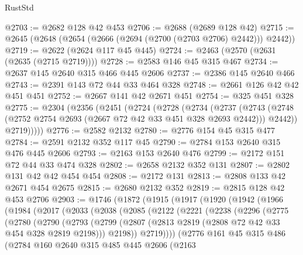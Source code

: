 \begin{lexlean}{RustStd}
\begin{coremodule}
@2703 := @2682 @128 @42 @453
@2706 := @2688 (@2689 @128 @42)
@2715 := @2645 (@2648 (@2654 (@2666 (@2694 (@2700 (@2703 @2706) @2442))) @2442))
@2719 := @2622 (@2624 @117 @45 @445)
@2724 := @2463 (@2570 (@2631 (@2635 (@2715 @2719))))
@2728 := @2583 @146 @45 @315 @467
@2734 := @2637 @145 @2640 @315 @466 @445 @2606
@2737 := @2386 @145 @2640 @466
@2743 := @2391 @143 @72 @44 @33 @464 @328
@2748 := @2661 @126 @42 @42 @451 @451
@2752 := @2667 @141 @42 @2671 @451
@2754 := @325 @451 @328
@2775 := @2304
    (@2356
      (@2451
        (@2724
          (@2728
            (@2734
              (@2737
                (@2743 (@2748 (@2752 @2754 @2693 (@2667 @72 @42 @33 @451 @328 @2693 @2442))) @2442))
              @2719)))))
@2776 := @2582 @2132
@2780 := @2776 @154 @45 @315 @477
@2784 := @2591 @2132 @352 @117 @45
@2790 := @2784 @153 @2640 @315 @476 @445 @2606
@2793 := @2163 @153 @2640 @476
@2799 := @2172 @151 @72 @44 @33 @474 @328
@2802 := @2658 @2132 @352 @131
@2807 := @2802 @131 @42 @42 @454 @454
@2808 := @2172 @131
@2813 := @2808 @133 @42 @2671 @454 @2675
@2815 := @2680 @2132 @352
@2819 := @2815 @128 @42 @453 @2706
@2903 := @1746
    (@1872
      (@1915
        (@1917
          (@1920
            (@1942
              (@1966
                (@1984
                  (@2017
                    (@2033
                      (@2038
                        (@2085
                          (@2122
                            (@2221
                              (@2238
                                (@2296
                                  (@2775
                                    (@2780
                                      (@2790
                                        (@2793
                                          (@2799
                                            (@2807
                                              (@2813
                                                @2819
                                                (@2808 @72 @42 @33 @454 @328 @2819 @2198)))
                                            @2198))
                                        @2719))))
                                (@2776
                                  @161
                                  @45
                                  @315
                                  @486
                                  (@2784
                                    @160
                                    @2640
                                    @315
                                    @485
                                    @445
                                    @2606
                                    (@2163

\end{coremodule}
\end{lexlean}
